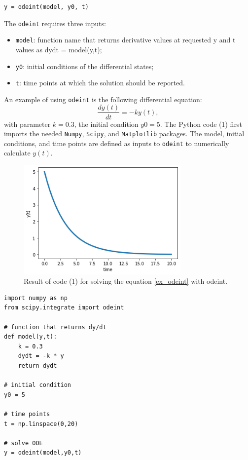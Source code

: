 \documentclass[11pt,a4paper]{article}
\begin{document}
\lstset{language=Python}
\lstset{frame=lines}
\lstset{basicstyle=\footnotesize}
\begin{lstlisting}
y = odeint(model, y0, t)
\end{lstlisting}
The \verb|odeint| requires three inputs: 
\begin{itemize}
	\item \verb|model|: function name that returns derivative values at requested y and t values as dydt = model(y,t);
	\item \verb|y0|: initial conditions of the differential states;
	\item \verb|t|: time points at which the solution should be reported.
\end{itemize}
An example of using \verb|odeint| is the following differential equation: 
\begin{equation}
\label{ex_odeint}
\dfrac{d y(t)}{d t} = -ky(t),
\end{equation}
with parameter $k=0.3$, the initial condition $y0=5$. The Python code (1) first imports the needed \verb|Numpy|, \verb|Scipy|, and \verb|Matplotlib| packages.  The model, initial conditions, and time points are defined as inputs to \verb|odeint| to numerically calculate $y(t)$.
\begin{figure}
	\centering
	\includegraphics[width=0.75\textwidth]{./Images/odeint_ex.png}
	\caption{Result of code (1) for solving the equation \eqref{ex_odeint} with odeint.}
	\label{fig:ex_odeint}
\end{figure}  

\lstset{language=Python}
\lstset{frame=lines}
\lstset{basicstyle=\footnotesize}
\begin{lstlisting}
import numpy as np
from scipy.integrate import odeint

# function that returns dy/dt
def model(y,t):
	k = 0.3
	dydt = -k * y
	return dydt

# initial condition
y0 = 5

# time points
t = np.linspace(0,20)

# solve ODE
y = odeint(model,y0,t)
\end{lstlisting}
\end{document}
